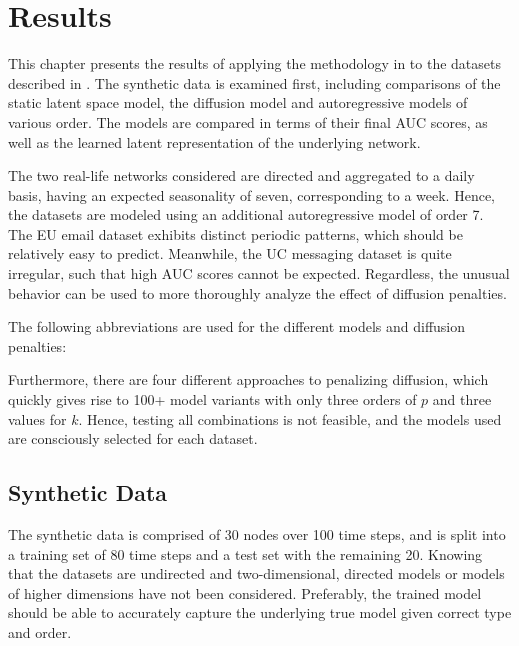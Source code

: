 \chapter{Results}\label{ch:Results}

This chapter presents the results of applying the methodology in  to the datasets described in . The synthetic data is examined first, including comparisons of the static latent space model, the diffusion model and autoregressive models of various order. The models are compared in terms of their final AUC scores, as well as the learned latent representation of the underlying network. 

The two real-life networks considered are directed and aggregated to a daily basis, having an expected seasonality of seven, corresponding to a week. Hence, the datasets are modeled using an additional autoregressive model of order 7. The EU email dataset exhibits distinct periodic patterns, which should be relatively easy to predict. Meanwhile, the UC messaging dataset is quite irregular, such that high AUC scores cannot be expected. Regardless, the unusual behavior can be used to more thoroughly analyze the effect of diffusion penalties.

The following abbreviations are used for the different models and diffusion penalties:

Furthermore, there are four different approaches to penalizing diffusion, which quickly gives rise to 100+ model variants with only three orders of $p$ and three values for $k$. Hence, testing all combinations is not feasible, and the models used are consciously selected for each dataset.


\section{Synthetic Data}

The synthetic data is comprised of 30 nodes over 100 time steps, and is split into a training set of 80 time steps and a test set with the remaining 20. Knowing that the datasets are undirected and two-dimensional, directed models or models of higher dimensions have not been considered. Preferably, the trained model should be able to accurately capture the underlying true model given correct type and order.

